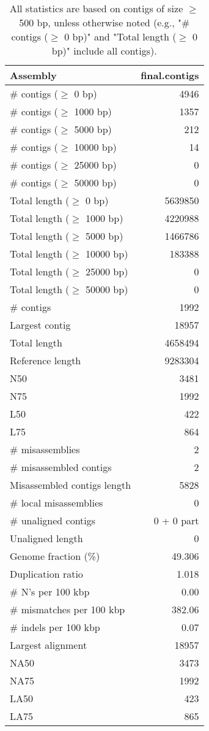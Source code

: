 \documentclass[12pt,a4paper]{article}
\begin{document}
\begin{table}[ht]
\begin{center}
\caption{All statistics are based on contigs of size $\geq$ 500 bp, unless otherwise noted (e.g., "\# contigs ($\geq$ 0 bp)" and "Total length ($\geq$ 0 bp)" include all contigs).}
\begin{tabular}{|l*{1}{|r}|}
\hline
Assembly & final.contigs \\ \hline
\# contigs ($\geq$ 0 bp) & 4946 \\ \hline
\# contigs ($\geq$ 1000 bp) & 1357 \\ \hline
\# contigs ($\geq$ 5000 bp) & 212 \\ \hline
\# contigs ($\geq$ 10000 bp) & 14 \\ \hline
\# contigs ($\geq$ 25000 bp) & 0 \\ \hline
\# contigs ($\geq$ 50000 bp) & 0 \\ \hline
Total length ($\geq$ 0 bp) & 5639850 \\ \hline
Total length ($\geq$ 1000 bp) & 4220988 \\ \hline
Total length ($\geq$ 5000 bp) & 1466786 \\ \hline
Total length ($\geq$ 10000 bp) & 183388 \\ \hline
Total length ($\geq$ 25000 bp) & 0 \\ \hline
Total length ($\geq$ 50000 bp) & 0 \\ \hline
\# contigs & 1992 \\ \hline
Largest contig & 18957 \\ \hline
Total length & 4658494 \\ \hline
Reference length & 9283304 \\ \hline
N50 & 3481 \\ \hline
N75 & 1992 \\ \hline
L50 & 422 \\ \hline
L75 & 864 \\ \hline
\# misassemblies & 2 \\ \hline
\# misassembled contigs & 2 \\ \hline
Misassembled contigs length & 5828 \\ \hline
\# local misassemblies & 0 \\ \hline
\# unaligned contigs & 0 + 0 part \\ \hline
Unaligned length & 0 \\ \hline
Genome fraction (\%) & 49.306 \\ \hline
Duplication ratio & 1.018 \\ \hline
\# N's per 100 kbp & 0.00 \\ \hline
\# mismatches per 100 kbp & 382.06 \\ \hline
\# indels per 100 kbp & 0.07 \\ \hline
Largest alignment & 18957 \\ \hline
NA50 & 3473 \\ \hline
NA75 & 1992 \\ \hline
LA50 & 423 \\ \hline
LA75 & 865 \\ \hline
\end{tabular}
\end{center}
\end{table}
\end{document}
